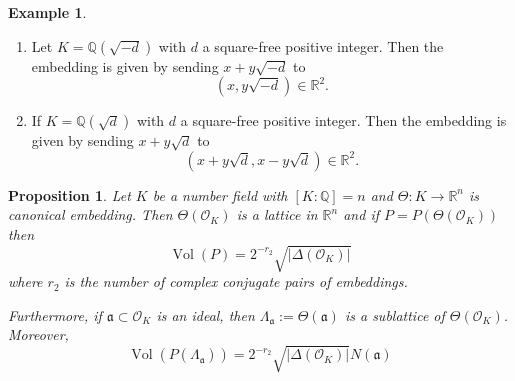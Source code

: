\documentclass[11pt,a4paper]{report}
\theoremstyle{plain}
\newtheorem{prop}[subsection]{Proposition}
\theoremstyle{definition}
\newtheorem{exmp}[subsection]{Example}
\theoremstyle{definition}
\newcommand{\RR}{\mathbb{R}}
\def\QQ{\mathbb{Q}}
\def \OO {\mathcal{O}}
\def\gotha{\mathfrak{a}}
\DeclareMathOperator{\Vol}{Vol}
\begin{document}
	\begin{exmp}
		\begin{enumerate}
			\item 	Let $K=\QQ(\sqrt{-d})$ with $d$ a square-free positive integer. Then the embedding is given by sending $x+y\sqrt{-d}$ to \[(x,y\sqrt{-d}) \in \RR^2. \]
			\item If $K=\QQ(\sqrt{d})$ with $d$ a square-free positive integer. Then the embedding is given by sending $x+y\sqrt{d}$ to \[(x+y\sqrt{d},x-y\sqrt{d}) \in \RR^2. \]
		\end{enumerate}
		
	\end{exmp}
	
	\begin{prop}Let $K$ be a number field with $[K:\QQ]=n$ and $\Theta: K \to \RR^n$ is canonical embedding. Then $\Theta(\OO_K)$ is a lattice in $\RR^n$ and if $P=P(\Theta(\OO_K))$ then \[\Vol(P)=2^{-r_2}\sqrt{|\Delta(\OO_K)|}\] where $r_2$ is the number of complex conjugate pairs of embeddings.
		
		Furthermore, if $\gotha \subset \OO_K$ is an ideal, then $\Lambda_\gotha:=\Theta(\gotha)$ is a sublattice of $\Theta(\OO_K)$. 	Moreover, \[\Vol(P(\Lambda_\gotha))=2^{-r_2}\sqrt{|\Delta(\OO_K)|}N(\gotha)\]
		
	\end{prop}
	
\end{document}
